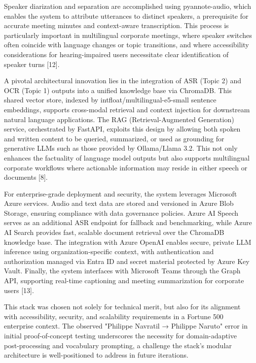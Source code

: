 \documentclass[12pt,a4paper]{article}
\begin{document}
Speaker diarization and separation are accomplished using pyannote-audio, which enables the system to attribute utterances to distinct speakers, a prerequisite for accurate meeting minutes and context-aware transcription. This process is particularly important in multilingual corporate meetings, where speaker switches often coincide with language changes or topic transitions, and where accessibility considerations for hearing-impaired users necessitate clear identification of speaker turns [12].


A pivotal architectural innovation lies in the integration of ASR (Topic 2) and OCR (Topic 1) outputs into a unified knowledge base via ChromaDB. This shared vector store, indexed by intfloat/multilingual-e5-small sentence embeddings, supports cross-modal retrieval and context injection for downstream natural language applications. The RAG (Retrieval-Augmented Generation) service, orchestrated by FastAPI, exploits this design by allowing both spoken and written content to be queried, summarized, or used as grounding for generative LLMs such as those provided by Ollama/Llama 3.2. This not only enhances the factuality of language model outputs but also supports multilingual corporate workflows where actionable information may reside in either speech or documents [8].


For enterprise-grade deployment and security, the system leverages Microsoft Azure services. Audio and text data are stored and versioned in Azure Blob Storage, ensuring compliance with data governance policies. Azure AI Speech serves as an additional ASR endpoint for fallback and benchmarking, while Azure AI Search provides fast, scalable document retrieval over the ChromaDB knowledge base. The integration with Azure OpenAI enables secure, private LLM inference using organization-specific context, with authentication and authorization managed via Entra ID and secret material protected by Azure Key Vault. Finally, the system interfaces with Microsoft Teams through the Graph API, supporting real-time captioning and meeting summarization for corporate users [13].


This stack was chosen not solely for technical merit, but also for its alignment with accessibility, security, and scalability requirements in a Fortune 500 enterprise context. The observed "Philippe Navratil → Philippe Naruto" error in initial proof-of-concept testing underscores the necessity for domain-adaptive post-processing and vocabulary prompting, a challenge the stack’s modular architecture is well-positioned to address in future iterations.
\end{document}
